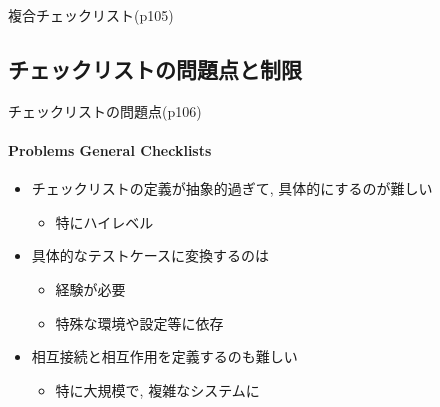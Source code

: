 \begin{frame}[shrink=5]{複合チェックリスト(p105)}
\end{frame}

\subsection{チェックリストの問題点と制限}
\begin{frame}{チェックリストの問題点(p106)}
\framesubtitle{Problems General Checklists}

\begin{itemize}
\item チェックリストの定義が抽象的過ぎて, 具体的にするのが難しい
    \begin{itemize}
    \item 特にハイレベル
    \end{itemize}
\item 具体的なテストケースに変換するのは
    \begin{itemize}
    \item 経験が必要
    \item 特殊な環境や設定等に依存
    \end{itemize}
\item 相互接続と相互作用を定義するのも難しい 
    \begin{itemize}
    \item 特に大規模で, 複雑なシステムに
    \end{itemize}
\end{itemize}

\end{frame}
